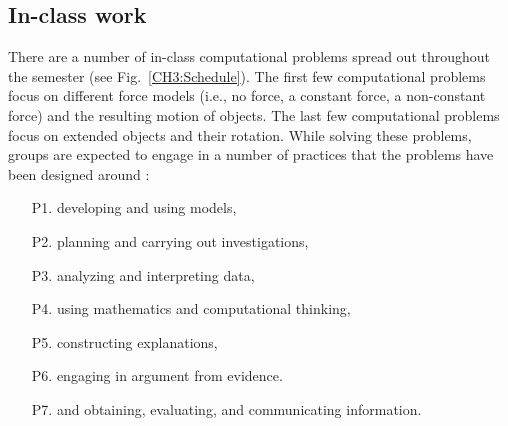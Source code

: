 \documentclass{msuphddissertation}
\begin{document}
\begin{doublespace}
\section{In-class work}\label{CH3:InClassWork}

There are a number of in-class computational problems spread out throughout the semester (see Fig.~\ref{CH3:Schedule}).  The first few computational problems focus on different force models (i.e., no force, a constant force, a non-constant force) and the resulting motion of objects.  The last few computational problems focus on extended objects and their rotation.  While solving these problems, groups are expected to engage in a number of practices that the problems have been designed around \cite{NGSS2012}: \begin{enumerate}
\item[P1.] developing and using models,
\item[P2.] planning and carrying out investigations,
\item[P3.] analyzing and interpreting data,
\item[P4.] using mathematics and computational thinking,
\item[P5.] constructing explanations,
\item[P6.] engaging in argument from evidence.
\item[P7.] and obtaining, evaluating, and communicating information.
\end{enumerate}


\end{doublespace}
\end{document}
